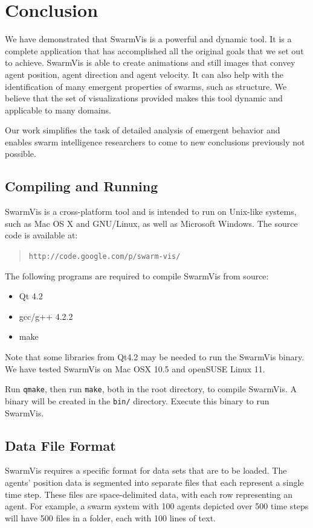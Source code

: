 \documentclass[conference]{IEEEtran}
\begin{document}
\section{Conclusion}
We have demonstrated that SwarmVis is a powerful and dynamic tool.
It is a complete application that has accomplished all the original goals that we set out to achieve.
SwarmVis is able to create animations and still images that convey agent position, agent direction and agent velocity.
It can also help with the identification of many emergent properties of swarms, such as structure.
We believe that the set of visualizations provided makes this tool dynamic and applicable to many domains.

Our work simplifies the task of detailed analysis of emergent behavior and
enables swarm intelligence researchers to come to new conclusions previously not possible.




\vspace{50pt}


\pagebreak


\subsection{Compiling and Running}
SwarmVis is a cross-platform tool
and is intended to run on Unix-like systems, such as Mac OS X and GNU/Linux, as well as Microsoft Windows.
The source code is available at:\begin{quote}\texttt{http://code.google.com/p/swarm-vis/}\end{quote}
The following programs are required to compile SwarmVis from source:
\begin{itemize}
\item Qt 4.2
\item gcc/g++ 4.2.2
\item make
\end{itemize}
Note that some libraries from Qt4.2 may be needed to run the SwarmVis binary.
We have tested SwarmVis on Mac OSX 10.5 and openSUSE Linux 11.

Run \texttt{qmake}, then run \texttt{make}, both in the root directory, to compile SwarmVis.
A binary will be created in the \texttt{bin/} directory. Execute this binary to run SwarmVis.

\subsection{Data File Format}
SwarmVis requires a specific format for data sets that are to be loaded. The agents' position data is segmented into
separate files that each represent a single time step. These files are space-delimited data, with
each row representing an agent. For example, a swarm system with 100 agents depicted over 500 time steps
will have 500 files in a folder, each with 100 lines of text.
\end{document}

